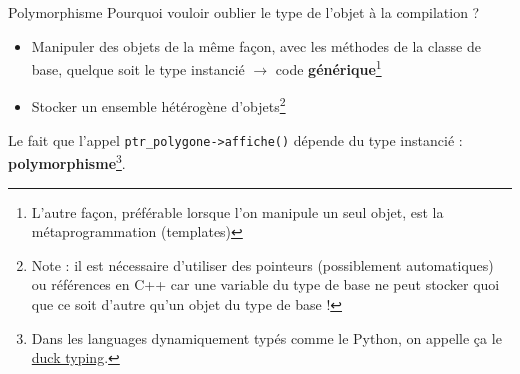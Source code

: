 \documentclass[c]{beamer}
\newcommand{\inline}[1]{\texttt{#1}}
\begin{document}
\begin{frame}[fragile]{Polymorphisme}
Pourquoi vouloir oublier le type de l'objet à la compilation ?
\pause
\begin{itemize}
  \item Manipuler des objets de la même façon, avec les méthodes de la classe de base, quelque soit le type instancié $\rightarrow$ code \textbf{générique}\footnote{L'autre façon, préférable lorsque l'on manipule un seul objet, est la métaprogrammation (templates)}
  \item Stocker un ensemble hétérogène d'objets\footnote{Note : il est nécessaire d'utiliser des pointeurs (possiblement automatiques) ou références en C++ car une variable du type de base ne peut stocker quoi que ce soit d'autre qu'un objet du type de base !}
\end{itemize}
\pause
Le fait que l'appel \inline{ptr_polygone->affiche()} dépende du type instancié : \textbf{polymorphisme}\footnote{Dans les languages dynamiquement typés comme le Python, on appelle ça le \href{https://fr.wikipedia.org/wiki/Duck_typing}{duck typing}.}.
\end{frame}

\end{document}
